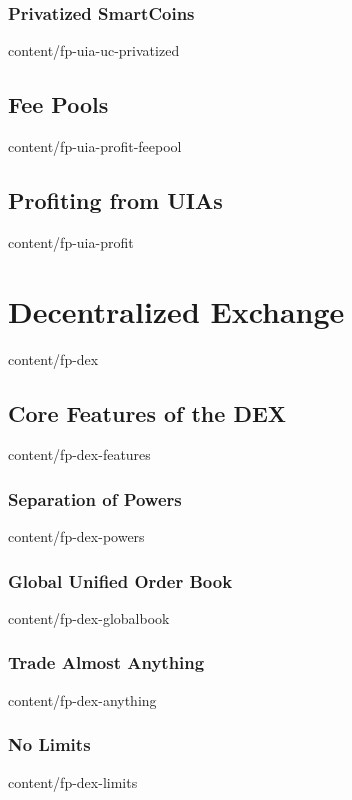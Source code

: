 \documentclass{btswhitepaper}
\begin{document}
\subsubsection  { Privatized SmartCoins                            }  { content/fp-uia-uc-privatized   } 
\subsection     { Fee Pools                                        }  { content/fp-uia-profit-feepool  } 
\subsection     { Profiting from UIAs                              }  { content/fp-uia-profit          } 

\section        { Decentralized Exchange                           }  { content/fp-dex                 } 
\subsection     { Core Features of the DEX                         }  { content/fp-dex-features        } 
\subsubsection  { Separation of Powers                             }  { content/fp-dex-powers          } 
\subsubsection  { Global Unified Order Book                        }  { content/fp-dex-globalbook      } 
\subsubsection  { Trade Almost Anything                            }  { content/fp-dex-anything        } 
\subsubsection  { No Limits                                        }  { content/fp-dex-limits          } 
\end{document}

